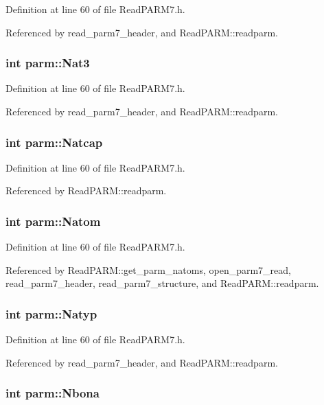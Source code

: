 Definition at line 60 of file Read\-PARM7.h.

Referenced by read\_\-parm7\_\-header, and Read\-PARM::readparm.
\subsubsection{\setlength{\rightskip}{0pt plus 5cm}int parm::Nat3}\label{structparm_m24}




Definition at line 60 of file Read\-PARM7.h.

Referenced by read\_\-parm7\_\-header, and Read\-PARM::readparm.
\subsubsection{\setlength{\rightskip}{0pt plus 5cm}int parm::Natcap}\label{structparm_m31}




Definition at line 60 of file Read\-PARM7.h.

Referenced by Read\-PARM::readparm.
\subsubsection{\setlength{\rightskip}{0pt plus 5cm}int parm::Natom}\label{structparm_m4}




Definition at line 60 of file Read\-PARM7.h.

Referenced by Read\-PARM::get\_\-parm\_\-natoms, open\_\-parm7\_\-read, read\_\-parm7\_\-header, read\_\-parm7\_\-structure, and Read\-PARM::readparm.
\subsubsection{\setlength{\rightskip}{0pt plus 5cm}int parm::Natyp}\label{structparm_m22}




Definition at line 60 of file Read\-PARM7.h.

Referenced by read\_\-parm7\_\-header, and Read\-PARM::readparm.
\subsubsection{\setlength{\rightskip}{0pt plus 5cm}int parm::Nbona}\label{structparm_m16}




